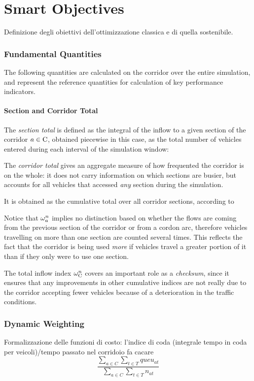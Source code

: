 \chapter{Smart Objectives}
Definizione degli obiettivi dell'ottimizzazione classica e di quella sostenibile.

\subsection{Fundamental Quantities}
The following quantities are calculated on the corridor over the entire simulation, and represent the reference quantities for calculation of key performance indicators.

\subsubsection*{Section and Corridor Total}
The \emph{section total} is defined as the integral of the inflow to a given section of the corridor $a \in \mathrm{C}$, obtained piecewise in this case, as the total number of vehicles entered during each interval of the simulation window:

The \emph{corridor total} gives an aggregate measure of how frequented the corridor is on the whole: it does not carry information on which sections are busier, but accounts for all vehicles that accessed \emph{any} section during the simulation.

It is obtained as the cumulative total over all corridor sections, according to

Notice that $\omega_{a}^{n}$ implies no distinction based on whether the flows are coming from the previous section of the corridor or from a cordon arc, therefore vehicles travelling on more than one section are counted several times. 
This reflects the fact that the corridor is being used \emph{more} if vehicles travel a greater portion of it than if they only were to use one section.

The total inflow index $\omega_{\mathrm{C}}^{n}$ covers an important role as a \emph{checksum}, since it ensures that any improvements in other cumulative indices are not really due to the corridor accepting fewer vehicles because of a deterioration in the traffic conditions.


\subsection{Dynamic Weighting}
Formalizzazione delle funzioni di costo:
l'indice di coda (integrale tempo in coda per veicoli)/tempo passato nel corridoio fa cacare
$$
\frac{\sum_{a \in C} \sum_{t \in T}{queu_{at}}}{\sum_{a \in C} \sum_{t \in T}{n_{at}}}
$$

